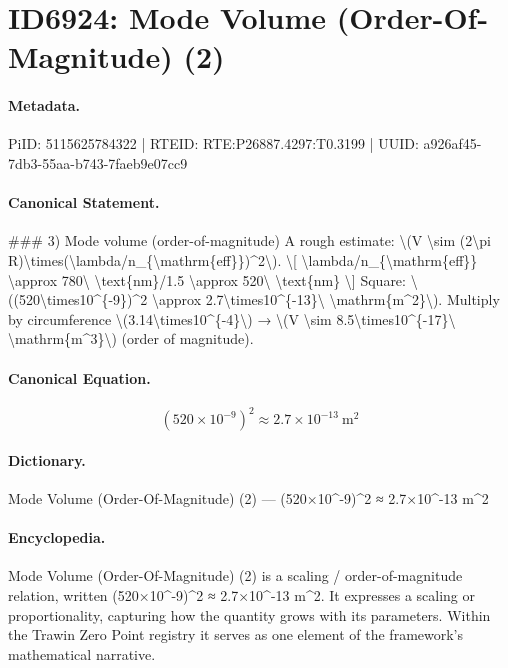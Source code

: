\section*{ID6924: Mode Volume (Order-Of-Magnitude) (2)}
\paragraph{Metadata.}
PiID: 5115625784322 | RTEID: RTE:P26887.4297:T0.3199 | UUID: a926af45-7db3-55aa-b743-7faeb9e07cc9

\paragraph{Canonical Statement.}
\#\#\# 3) Mode volume (order-of-magnitude) A rough estimate: \textbackslash{}(V \textbackslash{}sim (2\textbackslash{}pi R)\textbackslash{}times(\textbackslash{}lambda/n\_\{\textbackslash{}mathrm\{eff\}\})\textasciicircum{}2\textbackslash{}). \textbackslash{}[ \textbackslash{}lambda/n\_\{\textbackslash{}mathrm\{eff\}\} \textbackslash{}approx 780\textbackslash{} \textbackslash{}text\{nm\}/1.5 \textbackslash{}approx 520\textbackslash{} \textbackslash{}text\{nm\} \textbackslash{}] Square: \textbackslash{}((520\textbackslash{}times10\textasciicircum{}\{-9\})\textasciicircum{}2 \textbackslash{}approx 2.7\textbackslash{}times10\textasciicircum{}\{-13\}\textbackslash{} \textbackslash{}mathrm\{m\textasciicircum{}2\}\textbackslash{}). Multiply by circumference \textbackslash{}(3.14\textbackslash{}times10\textasciicircum{}\{-4\}\textbackslash{}) → \textbackslash{}(V \textbackslash{}sim 8.5\textbackslash{}times10\textasciicircum{}\{-17\}\textbackslash{} \textbackslash{}mathrm\{m\textasciicircum{}3\}\textbackslash{}) (order of magnitude).

\paragraph{Canonical Equation.}
\[
(520\times10^{-9})^2 \approx 2.7\times10^{-13}\ \mathrm{m^2}
\]

\paragraph{Dictionary.}
Mode Volume (Order-Of-Magnitude) (2) — (520×10\textasciicircum{}-9)\textasciicircum{}2 ≈ 2.7×10\textasciicircum{}-13 m\textasciicircum{}2

\paragraph{Encyclopedia.}
Mode Volume (Order-Of-Magnitude) (2) is a scaling / order-of-magnitude relation, written (520×10\textasciicircum{}-9)\textasciicircum{}2 ≈ 2.7×10\textasciicircum{}-13 m\textasciicircum{}2. It expresses a scaling or proportionality, capturing how the quantity grows with its parameters. Within the Trawin Zero Point registry it serves as one element of the framework's mathematical narrative.
